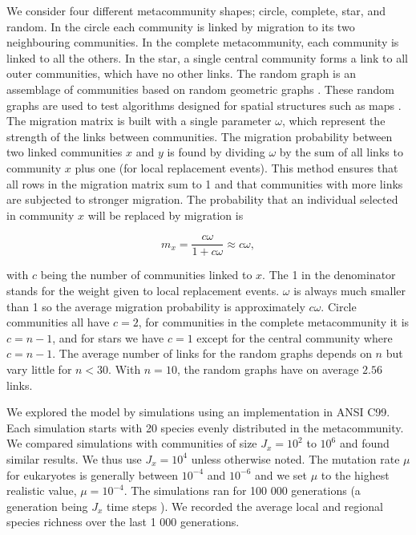\documentclass[letterpaper,twocolumn,superscriptaddress,showkeys]{revtex4}
\begin{document}
We consider four different metacommunity shapes; circle, complete, star, and random. In the circle each community is linked by migration to its two neighbouring communities. In the complete metacommunity, each community is linked to all the others. In the star, a single central community forms a link to all outer communities, which have no other links. The random graph is an assemblage of communities based on random geometric graphs \cite{pen03}. These random graphs are used to test algorithms designed for spatial structures such as maps \cite{sed02}. The migration matrix is built with a single parameter $\omega$, which represent the strength of the links between communities. The migration probability between two linked communities $x$ and $y$ is found by dividing $\omega$ by the sum of all links to community $x$ plus one (for local replacement events). This method ensures that all rows in the migration matrix sum to 1 and that communities with more links are subjected to stronger migration. The probability that an individual selected in community $x$ will be replaced by migration is

\begin{equation}
  m_x = \frac{c\omega}{1 + c\omega} \approx c\omega,
\end{equation}

with $c$ being the number of communities linked to $x$. The 1 in the denominator stands for the weight given to local replacement events. $\omega$ is always much smaller than 1 so the average migration probability is approximately $c\omega$. Circle communities all have $c = 2$, for communities in the complete metacommunity it is $c = n - 1$, and for stars we have $c = 1$ except for the central community where $c = n - 1$. The average number of links for the random graphs depends on $n$ but vary little for $n < 30$. With $n = 10$, the random graphs have on average $2.56$ links.

We explored the model by simulations using an implementation in ANSI C99. Each simulation starts with 20 species evenly distributed in the metacommunity. We compared simulations with communities of size $J_x = 10^2$ to $10^6$ and found similar results. We thus use $J_x = 10^4$ unless otherwise noted. The mutation rate $\mu$ for eukaryotes is generally between $10^{-4}$ and $10^{-6}$ \cite{dra98,gav04} and we set $\mu$ to the highest realistic value, $\mu = 10^{-4}$. The simulations ran for 100 000 generations (a generation being $J_x$ time steps \cite{ros10}). We recorded the average local and regional species richness over the last 1 000 generations.
\end{document}
